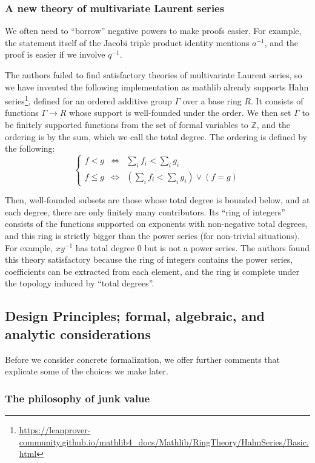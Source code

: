 \documentclass[12pt]{amsart}
\theoremstyle{definition}
\theoremstyle{remark}
\numberwithin{equation}{subsection}
\newcommand{\Z}{\mathbb Z}
\begin{document}
\subsubsection{A new theory of multivariate Laurent series}

We often need to ``borrow'' negative powers to make proofs easier. For example, the statement itself of the Jacobi triple product identity mentions $a^{-1}$, and the proof is easier if we involve $q^{-1}$.

The authors failed to find satisfactory theories of multivariate Laurent series, so we have invented the following implementation as mathlib already supports Hahn series\footnote{\url{https://leanprover-community.github.io/mathlib4_docs/Mathlib/RingTheory/HahnSeries/Basic.html}}, defined for an ordered additive group $\Gamma$ over a base ring $R$. It consists of functions $\Gamma \to R$ whose support is well-founded under the order. We then set $\Gamma$ to be finitely supported functions from the set of formal variables to $\Z$, and the ordering is by the sum, which we call the total degree. The ordering is defined by the following:
\[
\left\{
\begin{matrix}
    f < g &\iff& \sum_i f_i < \sum_i g_i \\
    f \le g &\iff& (\sum_i f_i < \sum_i g_i) \lor (f = g)
\end{matrix}
\right.
\]

Then, well-founded subsets are those whose total degree is bounded below, and at each degree, there are only finitely many contributors.
Its ``ring of integers'' consists of the functions supported on exponents with non-negative total degrees, and this ring is strictly bigger than the power series (for non-trivial situations). For example, $xy^{-1}$ has total degree $0$ but is not a power series.
The authors found this theory satisfactory because the ring of integers contains the power series, coefficients can be extracted from each element, and the ring is complete under the topology induced by ``total degrees''.




\subsection{Design Principles; formal, algebraic, and analytic considerations}
Before we consider concrete formalization, we offer further comments that explicate some of the choices we make later.

\subsubsection{The philosophy of junk value}
\end{document}
